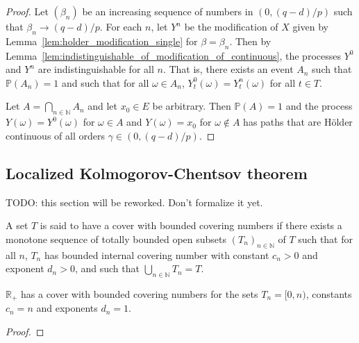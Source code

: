 \begin{proof}
Let $(\beta_n)$ be an increasing sequence of numbers in $(0, (q - d)/p)$ such that $\beta_n \to (q - d)/p$.
For each $n$, let $Y^n$ be the modification of $X$ given by Lemma~\ref{lem:holder_modification_single} for $\beta = \beta_n$.
Then by Lemma~\ref{lem:indistinguishable_of_modification_of_continuous}, the processes $Y^0$ and $Y^n$ are indistinguishable for all $n$.
That is, there exists an event $A_n$ such that $\mathbb{P}(A_n) = 1$ and such that for all $\omega \in A_n$, $Y^0_t(\omega) = Y^n_t(\omega)$ for all $t \in T$.

Let $A = \bigcap_{n \in \mathbb{N}} A_n$ and let $x_0 \in E$ be arbitrary.
Then $\mathbb{P}(A) = 1$ and the process $Y(\omega) = Y^0(\omega)$ for $\omega \in A$ and $Y(\omega) = x_0$ for $\omega \notin A$ has paths that are Hölder continuous of all orders $\gamma \in (0, (q - d)/p)$.
\end{proof}



\subsection{Localized Kolmogorov-Chentsov theorem}

TODO: this section will be reworked. Don't formalize it yet.

\begin{definition}\label{def:HasBoundedCoveringNumberCover}
A set $T$ is said to have a cover with bounded covering numbers if there exists a monotone sequence of totally bounded open subsets $(T_n)_{n \in \mathbb{N}}$ of $T$ such that for all $n$, $T_n$ has bounded internal covering number with constant $c_n>0$ and exponent $d_n > 0$, and such that $\bigcup_{n \in \mathbb{N}} T_n = T$.
\end{definition}


\begin{lemma}\label{lem:hasBoundedCoveringNumberCover_nnreal}
$\mathbb{R}_+$ has a cover with bounded covering numbers for the sets $T_n = [0,n)$, constants $c_n = n$ and exponents $d_n = 1$.
\end{lemma}

\begin{proof}

\end{proof}


